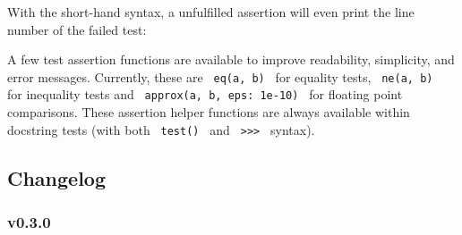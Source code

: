 With the short-hand syntax, a unfulfilled assertion will even print the
line number of the failed test:

\begin{Shaded}
\begin{Highlighting}[]
\end{Highlighting}
\end{Shaded}

A few test assertion functions are available to improve readability,
simplicity, and error messages. Currently, these are
\texttt{\ eq(a,\ b)\ } for equality tests, \texttt{\ ne(a,\ b)\ } for
inequality tests and \texttt{\ approx(a,\ b,\ eps:\ 1e-10)\ } for
floating point comparisons. These assertion helper functions are always
available within docstring tests (with both \texttt{\ test()\ } and
\texttt{\ \textgreater{}\textgreater{}\textgreater{}\ } syntax).

\subsection{Changelog}\label{changelog}

\subsubsection{v0.3.0}\label{v0.3.0}


